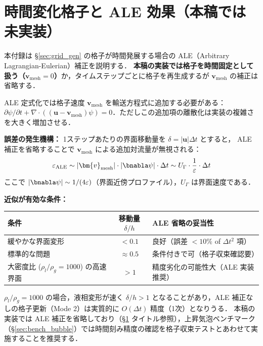 \section{時間変化格子と ALE 効果（本稿では未実装）}
\label{app:grid_ale}

本付録は §\ref{sec:grid_gen} の格子が時間発展する場合の ALE（Arbitrary Lagrangian-Eulerian）補正を説明する．
\textbf{本稿の実装では格子を時間固定として扱う（$\bm{v}_\text{mesh} = 0$）}か，タイムステップごとに格子を再生成するが $\bm{v}_\text{mesh}$ の補正は省略する．

ALE 定式化では格子速度 $\bm{v}_\text{mesh}$ を輸送方程式に追加する必要がある：$\partial\psi/\partial t + \nabla\cdot((\bm{u} - \bm{v}_\text{mesh})\psi) = 0$．ただしこの追加項の離散化は実装の複雑さを大きく増加させる．

\textbf{誤差の発生機構：}
1ステップあたりの界面移動量を $\delta = |\bm{u}|\Delta t$ とすると，
ALE 補正を省略することで $\bm{v}_\text{mesh}$ による追加対流量が無視される：
\[
  \varepsilon_{\text{ALE}} \sim |\bm{v}_\text{mesh}| \cdot |\bnabla\psi| \cdot \Delta t \sim U_\Gamma \cdot \frac{1}{\varepsilon} \cdot \Delta t
\]
ここで $|\bnabla\psi| \sim 1/(4\varepsilon)$（界面近傍プロファイル），$U_\Gamma$ は界面速度である．

\textbf{近似が有効な条件：}
\begin{center}
\renewcommand{\arraystretch}{1.3}
\begin{tabular}{>{\raggedright\arraybackslash}p{48mm}c>{\raggedright\arraybackslash}p{42mm}}
\hline
条件 & 移動量 $\delta/h$ & ALE 省略の妥当性 \\
\hline
緩やかな界面変形 & $< 0.1$ & 良好（誤差 $< 10\%$ of $\Delta t^2$ 項） \\
標準的な問題 & $\approx 0.5$ & 条件付きで可（格子収束確認要） \\
大密度比 ($\rho_l/\rho_g{=}1000$) の高速界面 & $> 1$ & 精度劣化の可能性大（ALE 実装推奨） \\
\hline
\end{tabular}
\end{center}

$\rho_l/\rho_g = 1000$ の場合，液相変形が速く $\delta/h > 1$ となることがあり，ALE 補正なしの格子更新（Mode 2）は実質的に $O(\Delta t)$ 精度（1次）となりうる．
本稿の実装では ALE 補正を省略しており（§\ref{app:grid_ale} タイトル参照），上昇気泡ベンチマーク（§\ref{sec:bench_bubble}）では時間刻み精度の確認を格子収束テストとあわせて実施することを推奨する．


